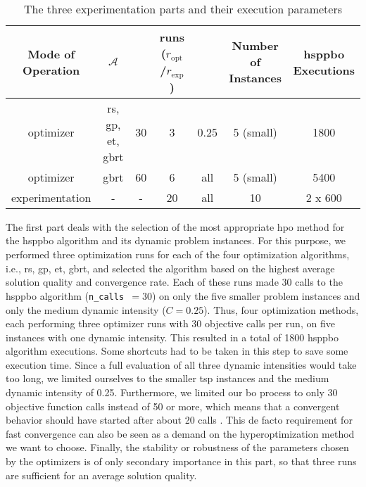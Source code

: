 \begin{table}[ht]
	 \caption{The three experimentation parts and their execution parameters}
	\label{tab:exp-setup}
	\centering
	\begin{adjustbox}{width=1\textwidth}
	\begin{tabular}{c c c c c c c}
		\hline
		\thead{Mode of\\Operation} & \thead{HPO Method} $\mathcal{A}$ & \thead{n\_calls} & \thead{runs\\ ($r_\text{opt}$/$r_\text{exp}$)} & \thead{Dynamic Intensity $C$} & \thead{Number of\\Instances} & \thead{\gls{hsppbo}\\Executions} \\
		\hline
		optimizer & \makecell{\gls{rs}, \gls{gp},\\ \gls{et}, \gls{gbrt}} & 30 & 3 & 0.25 & 5 (small) & 1800 \\

		optimizer & \gls{gbrt} & 60 & 6 & all & 5 (small) & 5400 \\
		experimentation & - & - & 20 & all & 10  & 2 x 600 \\ \hline
	\end{tabular}
\end{adjustbox}
\end{table}

The first part deals with the selection of the most appropriate \gls{hpo} method for the \gls{hsppbo} algorithm and its dynamic problem instances. For this purpose, we performed three optimization runs for each of the four optimization algorithms, i.e., \gls{rs}, \gls{gp}, \gls{et}, \gls{gbrt}, and selected the algorithm based on the highest average solution quality and convergence rate. Each of these runs made 30 calls to the \gls{hsppbo} algorithm (\texttt{n\_calls }$= 30$) on only the five smaller problem instances and only the medium dynamic intensity ($C = 0.25$). Thus, four optimization methods, each performing three optimizer runs with 30 objective calls per run, on five instances with one dynamic intensity. This resulted in a total of 1800 \gls{hsppbo} algorithm executions. Some shortcuts had to be taken in this step to save some execution time. Since a full evaluation of all three dynamic intensities would take too long, we limited ourselves to the smaller \gls{tsp} instances and the medium dynamic intensity of 0.25. Furthermore, we limited our \gls{bo} process to only 30 objective function calls instead of 50 or more, which means that a convergent behavior should have started after about 20 calls \cite{head2016}. This de facto requirement for fast convergence can also be seen as a demand on the hyperoptimization method we want to choose. Finally, the stability or robustness of the parameters chosen by the optimizers is of only secondary importance in this part, so that three runs are sufficient for an average solution quality.

